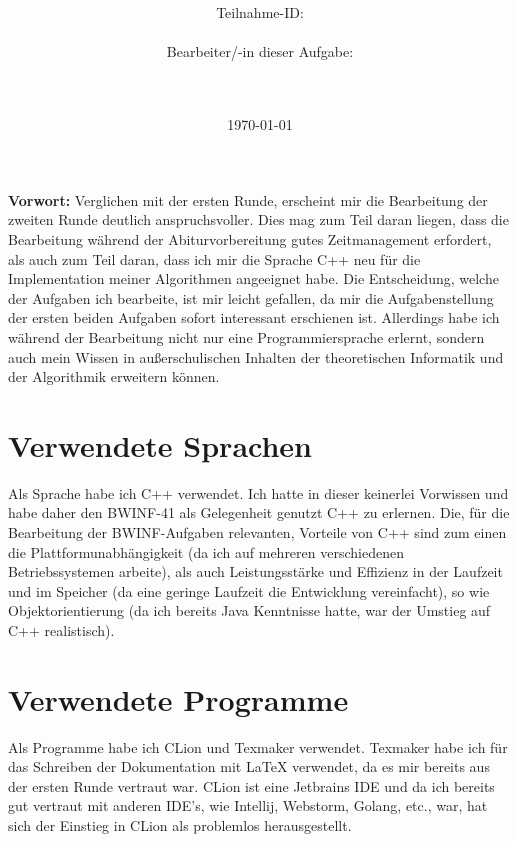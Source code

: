 \documentclass[a4paper,10pt,ngerman]{scrartcl}
\title{\textbf{\Huge\Aufgabe}}
\author{\LARGE Teilnahme-ID: \LARGE \TeilnahmeId \\\\
\LARGE Bearbeiter/-in dieser Aufgabe: \\
\LARGE \Name\\\\}
\date{\LARGE\today}
\begin{document}
    \maketitle
    \tableofcontents

    \vspace{0.5cm}

    \textbf{Vorwort:}
    Verglichen mit der ersten Runde, erscheint mir die Bearbeitung der zweiten Runde deutlich anspruchsvoller.
    Dies mag zum Teil daran liegen, dass die Bearbeitung während der Abiturvorbereitung gutes Zeitmanagement erfordert,
    als auch zum Teil daran, dass ich mir die Sprache C++ neu für die Implementation meiner Algorithmen angeeignet habe.
    \newline
    Die Entscheidung, welche der Aufgaben ich bearbeite, ist mir leicht gefallen, da mir die Aufgabenstellung der ersten beiden
    Aufgaben sofort interessant erschienen ist.
    Allerdings habe ich während der Bearbeitung nicht nur eine Programmiersprache erlernt,
    sondern auch mein Wissen in außerschulischen Inhalten der theoretischen Informatik und der Algorithmik erweitern können.

    \section{Verwendete Sprachen}\label{sec:verwendete-sprachen}
    Als Sprache habe ich C++ verwendet.
    Ich hatte in dieser keinerlei Vorwissen und habe daher den BWINF-41 als Gelegenheit genutzt C++ zu erlernen.
    Die, für die Bearbeitung der BWINF-Aufgaben relevanten, Vorteile von C++ sind zum einen die
    Plattformunabhängigkeit (da ich auf mehreren verschiedenen Betriebssystemen arbeite),
    als auch Leistungsstärke und Effizienz in der Laufzeit und im Speicher (da eine geringe Laufzeit die Entwicklung vereinfacht),
    so wie Objektorientierung (da ich bereits Java Kenntnisse hatte, war der Umstieg auf C++ realistisch).


    \section{Verwendete Programme}\label{sec:verwendete-programme}
    Als Programme habe ich CLion und Texmaker verwendet.
    Texmaker habe ich für das Schreiben der Dokumentation mit LaTeX verwendet,
    da es mir bereits aus der ersten Runde vertraut war.
    CLion ist eine Jetbrains IDE und da ich bereits gut vertraut mit anderen IDE's, wie Intellij, Webstorm, Golang, etc.,
    war, hat sich der Einstieg in CLion als problemlos herausgestellt.
\end{document}
